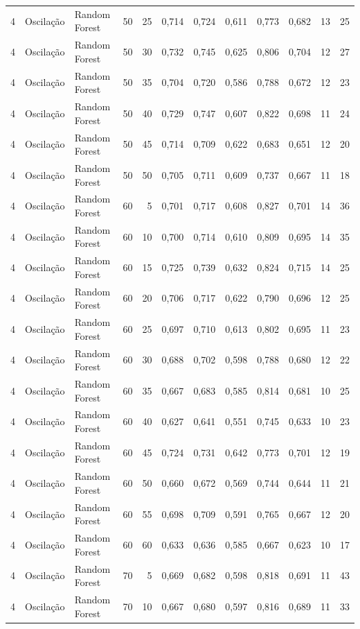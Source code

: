 \begin{longtable}{@{}rllrrrrrrrrr@{}}
4 & Oscilação & Random Forest & 50 & 25 & 0,714 & 0,724 & 0,611 & 0,773 & 0,682 & 13 & 25 \\
4 & Oscilação & Random Forest & 50 & 30 & 0,732 & 0,745 & 0,625 & 0,806 & 0,704 & 12 & 27 \\
4 & Oscilação & Random Forest & 50 & 35 & 0,704 & 0,720 & 0,586 & 0,788 & 0,672 & 12 & 23 \\
4 & Oscilação & Random Forest & 50 & 40 & 0,729 & 0,747 & 0,607 & 0,822 & 0,698 & 11 & 24 \\
4 & Oscilação & Random Forest & 50 & 45 & 0,714 & 0,709 & 0,622 & 0,683 & 0,651 & 12 & 20 \\
4 & Oscilação & Random Forest & 50 & 50 & 0,705 & 0,711 & 0,609 & 0,737 & 0,667 & 11 & 18 \\
4 & Oscilação & Random Forest & 60 & 5 & 0,701 & 0,717 & 0,608 & 0,827 & 0,701 & 14 & 36 \\
4 & Oscilação & Random Forest & 60 & 10 & 0,700 & 0,714 & 0,610 & 0,809 & 0,695 & 14 & 35 \\
4 & Oscilação & Random Forest & 60 & 15 & 0,725 & 0,739 & 0,632 & 0,824 & 0,715 & 14 & 25 \\
4 & Oscilação & Random Forest & 60 & 20 & 0,706 & 0,717 & 0,622 & 0,790 & 0,696 & 12 & 25 \\
4 & Oscilação & Random Forest & 60 & 25 & 0,697 & 0,710 & 0,613 & 0,802 & 0,695 & 11 & 23 \\
4 & Oscilação & Random Forest & 60 & 30 & 0,688 & 0,702 & 0,598 & 0,788 & 0,680 & 12 & 22 \\
4 & Oscilação & Random Forest & 60 & 35 & 0,667 & 0,683 & 0,585 & 0,814 & 0,681 & 10 & 25 \\
4 & Oscilação & Random Forest & 60 & 40 & 0,627 & 0,641 & 0,551 & 0,745 & 0,633 & 10 & 23 \\
4 & Oscilação & Random Forest & 60 & 45 & 0,724 & 0,731 & 0,642 & 0,773 & 0,701 & 12 & 19 \\
4 & Oscilação & Random Forest & 60 & 50 & 0,660 & 0,672 & 0,569 & 0,744 & 0,644 & 11 & 21 \\
4 & Oscilação & Random Forest & 60 & 55 & 0,698 & 0,709 & 0,591 & 0,765 & 0,667 & 12 & 20 \\
4 & Oscilação & Random Forest & 60 & 60 & 0,633 & 0,636 & 0,585 & 0,667 & 0,623 & 10 & 17 \\
4 & Oscilação & Random Forest & 70 & 5 & 0,669 & 0,682 & 0,598 & 0,818 & 0,691 & 11 & 43 \\
4 & Oscilação & Random Forest & 70 & 10 & 0,667 & 0,680 & 0,597 & 0,816 & 0,689 & 11 & 33 \\

\end{longtable}

